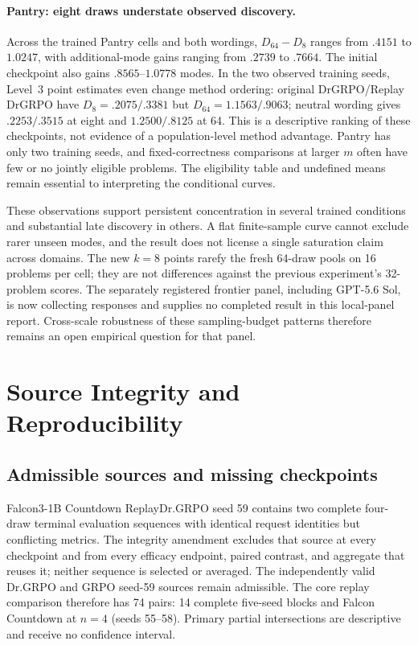 \documentclass{article}
\newcommand{\1}{\mathbf 1}
\theoremstyle{remark}
\theoremstyle{definition}
\theoremstyle{plain}
\begin{document}
\paragraph{Pantry: eight draws understate observed discovery.}
Across the trained Pantry cells and both wordings, $D_{64}-D_8$ ranges
from $.4151$ to $1.0247$, with additional-mode gains ranging from $.2739$
to $.7664$. The initial checkpoint also gains $.8565$--$1.0778$ modes.
In the two observed training seeds, Level~3 point estimates even change
method ordering: original DrGRPO/Replay DrGRPO have $D_8=.2075/.3381$
but $D_{64}=1.1563/.9063$; neutral wording gives $.2253/.3515$ at eight
and $1.2500/.8125$ at 64. This is a descriptive ranking of these checkpoints,
not evidence of a population-level method advantage. Pantry has only two
training seeds, and fixed-correctness comparisons at larger $m$ often have
few or no jointly eligible problems. The eligibility table and undefined
means remain essential to interpreting the conditional curves.

These observations support persistent concentration in several trained
conditions and substantial late discovery in others. A flat finite-sample
curve cannot exclude rarer unseen modes, and the result does not license a
single saturation claim across domains. The new $k=8$ points rarefy the fresh
64-draw pools on 16 problems per cell; they are not differences against the
previous experiment's 32-problem scores. The separately registered frontier
panel, including GPT-5.6 Sol, is now collecting responses and supplies
no completed result in this local-panel report. Cross-scale robustness of these sampling-budget
patterns therefore remains an open empirical question for that panel.



\section{Source Integrity and Reproducibility}
\label{app:reproducibility}

\subsection{Admissible sources and missing checkpoints}
\label{app:source-integrity}

Falcon3-1B Countdown ReplayDr.GRPO seed 59 contains two complete four-draw
terminal evaluation sequences with identical request identities but
conflicting metrics. The integrity amendment excludes that source at every
checkpoint and from every efficacy endpoint, paired contrast, and aggregate
that reuses it; neither sequence is selected or averaged. The independently
valid Dr.GRPO and GRPO seed-59 sources remain admissible. The core replay
comparison therefore has 74 pairs: 14 complete five-seed blocks and Falcon
Countdown at $n=4$ (seeds 55--58). Primary partial intersections are
descriptive and receive no confidence interval.
\end{document}
